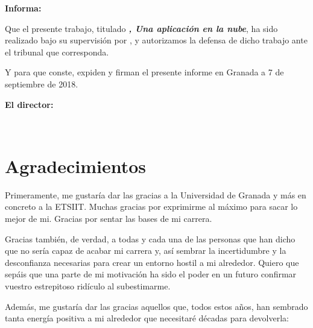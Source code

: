 \vspace{0.5cm}


\vspace{0.5cm}

\textbf{Informa:}

\vspace{0.5cm}

Que el presente trabajo, titulado \textit{\textbf{\myTitle, Una aplicación en la nube}},
ha sido realizado bajo su supervisión por \textbf{\myName}, y autorizamos la defensa de dicho trabajo ante el tribunal
que corresponda.

\vspace{0.5cm}

Y para que conste, expiden y firman el presente informe en Granada a 7 de septiembre de 2018.

\vspace{1cm}

\textbf{El director:}

\vspace{5cm}

\noindent \textbf{\myProf \ \ \ \ \ }

\chapter*{Agradecimientos}
\thispagestyle{empty}

       \vspace{1cm}
Primeramente, me gustaría dar las gracias a la Universidad de Granada y más en concreto a la ETSIIT. Muchas gracias por exprimirme al máximo para sacar lo mejor de mi. Gracias por sentar las bases de mi carrera.

Gracias también, de verdad, a todas y cada una de las personas que han dicho que no sería capaz de acabar mi carrera y, así sembrar la incertidumbre y la desconfianza necesarias para crear un entorno hostil a mi alrededor. Quiero que sepáis que una parte de mi motivación ha sido el poder en un futuro confirmar vuestro estrepitoso ridículo al subestimarme. 

Además, me gustaría dar las gracias aquellos que, todos estos años, han sembrado tanta energía positiva a mi alrededor que necesitaré décadas para devolverla:

